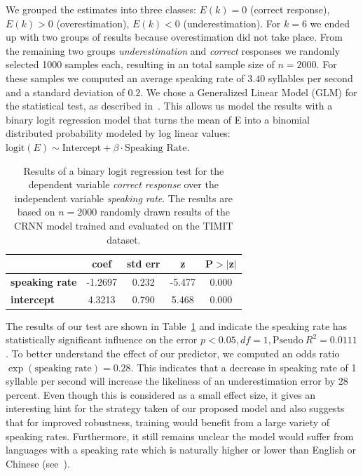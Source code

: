 We grouped the estimates into three classes: \(E(k) = 0\) (correct response), \(E(k) > 0\) (overestimation), \(E(k) < 0\) (underestimation).
For \(k=6\) we ended up with two groups of results because overestimation did not take place.
From the remaining two groups \emph{underestimation} and \emph{correct} responses we randomly selected 1000 samples each, resulting in an total sample size of \(n=2000\).
For these samples we computed an average speaking rate of \(3.40\) syllables per second and a standard deviation of \(0.2\).
We chose a Generalized Linear Model (GLM) for the statistical test, as described in~\cite{jaeger08}.
This allows us model the results with a binary logit regression model that turns the mean of E into a binomial distributed probability modeled by log linear values: \(\mbox{logit}(E) \sim \mbox{Intercept} + \beta \cdot{\mbox{Speaking Rate}}\).
\begin{table}[h]
\caption{Results of a binary logit regression test for the dependent variable \emph{correct response} over the independent variable \emph{speaking rate}. The results are based on $n=2000$ randomly drawn results of the CRNN model trained and evaluated on the TIMIT dataset.}%
\label{tab:logit}
\begin{center}
\begin{tabular}{lcccc}
\toprule
                        & \textbf{coef} & \textbf{std err} & \textbf{z} & \textbf{P$>$$|$z$|$} \\
\midrule
\textbf{speaking rate} &      -1.2697   &        0.232     &     -5.477  &         0.000        \\
\textbf{intercept}          &      4.3213  &        0.790     &    5.468  &         0.000  \\
\bottomrule
\end{tabular}
\end{center}
\end{table}
The results of our test are shown in Table~\ref{tab:logit} and indicate the speaking rate has statistically significant influence on the error \(p < 0.05, df=1, \textrm{Pseudo}\ R^2=0.0111\).
To better understand the effect of our predictor, we computed an odds ratio \(\exp(\mbox{speaking rate}) = 0.28\).
This indicates that a decrease in speaking rate of 1 syllable per second will increase the likeliness of an underestimation error by 28 percent.
Even though this is considered as a small effect size, it gives an interesting hint for the strategy taken of our proposed model and also suggests that for improved robustness, training would benefit from a large variety of speaking rates.
Furthermore, it still remains unclear the model would suffer from languages with a speaking rate which is naturally higher or lower than English or Chinese (see~\cite{Osser64}).
